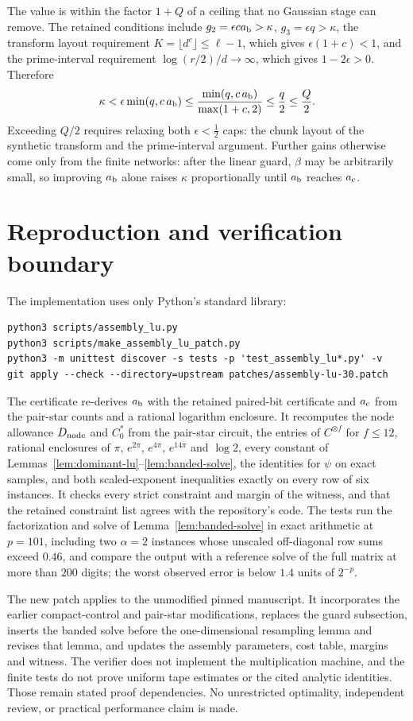 \documentclass[11pt]{article}
\newcommand{\ab}{a_{\rm b}}
\newcommand{\ac}{a_{\rm c}}
\begin{document}
The value is within the factor $1+Q$ of a ceiling that no Gaussian stage
can remove. The retained conditions include $g_2=\epsilon c\ab>\kappa$,
$g_3=\epsilon q>\kappa$, the transform layout requirement
$K=\lfloor d^c\rfloor\le\ell-1$, which gives $\epsilon(1+c)<1$, and the
prime-interval requirement $\log(r/2)/d\to\infty$, which gives
$1-2\epsilon>0$. Therefore
\[
 \kappa<\epsilon\min(q,c\,\ab)\le\frac{\min(q,c\,\ab)}{\max(1+c,2)}
 \le\frac q2\le\frac Q2 .
\]
Exceeding $Q/2$ requires relaxing both $\epsilon<\frac12$ caps: the chunk
layout of the synthetic transform and the prime-interval argument. Further
gains otherwise come only from the finite networks: after the linear guard,
$\beta$ may be arbitrarily small, so improving $\ab$ alone raises $\kappa$
proportionally until $\ab$ reaches $\ac$.

\section{Reproduction and verification boundary}
The implementation uses only Python's standard library:
\begin{verbatim}
python3 scripts/assembly_lu.py
python3 scripts/make_assembly_lu_patch.py
python3 -m unittest discover -s tests -p 'test_assembly_lu*.py' -v
git apply --check --directory=upstream patches/assembly-lu-30.patch
\end{verbatim}
The certificate re-derives $\ab$ with the retained paired-bit certificate and
$\ac$ from the pair-star counts and a rational logarithm enclosure. It
recomputes the node allowance $D_{\rm node}$ and $C_0^*$ from the pair-star
circuit, the entries of $C^{\otimes f}$ for $f\le12$, rational enclosures of
$\pi$, $e^{2\pi}$, $e^{4\pi}$, $e^{14\pi}$ and $\log2$, every constant of
Lemmas~\ref{lem:dominant-lu}--\ref{lem:banded-solve}, the identities for
$\psi$ on exact samples, and both scaled-exponent inequalities exactly on
every row of six instances. It checks every strict constraint and margin of
the witness, and that the retained constraint list agrees with the
repository's code. The tests run the factorization and solve of
Lemma~\ref{lem:banded-solve} in exact arithmetic at $p=101$, including two
$\alpha=2$ instances whose unscaled off-diagonal row sums exceed $0.46$, and
compare the output with a reference solve of the full matrix at more than
$200$ digits; the worst observed error is below $1.4$ units of $2^{-p}$.

The new patch applies to the unmodified pinned manuscript. It incorporates
the earlier compact-control and pair-star modifications, replaces the guard
subsection, inserts the banded solve before the one-dimensional resampling
lemma and revises that lemma, and updates the assembly parameters, cost
table, margins and witness. The verifier does not implement the
multiplication machine, and the finite tests do not prove uniform tape
estimates or the cited analytic identities. Those remain stated proof
dependencies. No unrestricted optimality, independent review, or practical
performance claim is made.
\end{document}
